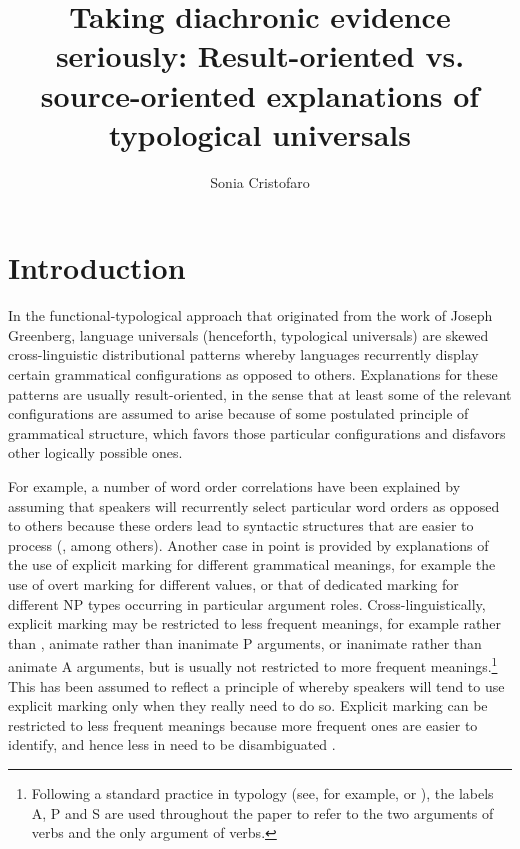 \documentclass[output=paper]{langsci/langscibook}
\author{Sonia Cristofaro\affiliation{University of Pavia}}
\title{Taking diachronic evidence seriously: Result-oriented  vs. source-oriented explanations of typological universals}
\begin{document}
\maketitle 
  
\label{p:cristofaro:evidenceseriously}
 

\section{Introduction}\label{intro}
In the functional-typological approach that originated from the work
of Joseph Greenberg, language universals (henceforth, typological
universals) are skewed cross-linguistic distributional patterns whereby languages recurrently display certain grammatical configurations as opposed to others. Explanations for these patterns are usually result-oriented, in the sense  that at least some of the relevant configurations are assumed to arise because of some postulated principle of grammatical structure, which favors those particular configurations and disfavors other logically possible ones.

For example, a number of word order correlations have been explained by assuming that speakers will recurrently select particular word orders as opposed to others because these orders lead to syntactic structures that are easier to process (\citealt{Hawkins2004},  among others). Another case in point is provided by explanations of the use of explicit marking for different grammatical meanings, for example the use of overt marking for different  values, or that of dedicated  marking for different NP types occurring in particular argument roles. Cross-linguistically, explicit marking may be restricted to less frequent meanings, for example  rather than , animate rather than
inanimate P arguments, or inanimate rather than animate A arguments, but
is usually not restricted to more frequent meanings.\footnote{Following a standard
    practice in typology (see, for example, \citealt{Comrie2} or \citealt{Dixon1994}), the labels A, P and S are used throughout
    the paper to refer to the two arguments of  verbs and
    the only argument of  verbs.} This has been assumed to reflect a principle of  whereby speakers will tend to use explicit marking only when they really need to do so. Explicit marking can be restricted to less frequent meanings because more frequent ones are easier to identify, and hence less in need to be disambiguated
\citep{Greenberg1966,Corbett2000,TU2,Martinmarkedness,Haspelmath2008}. 
\end{document}
